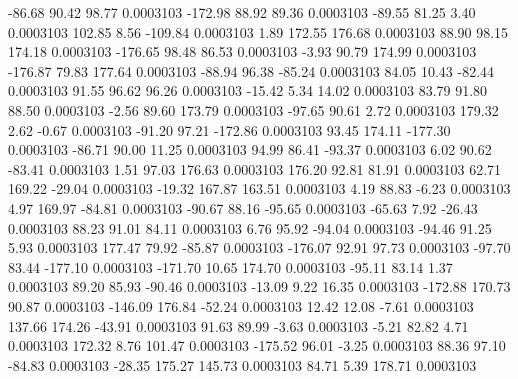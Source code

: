       -86.68       90.42       98.77     0.0003103
     -172.98       88.92       89.36     0.0003103
      -89.55       81.25        3.40     0.0003103
      102.85        8.56     -109.84     0.0003103
        1.89      172.55      176.68     0.0003103
       88.90       98.15      174.18     0.0003103
     -176.65       98.48       86.53     0.0003103
       -3.93       90.79      174.99     0.0003103
     -176.87       79.83      177.64     0.0003103
      -88.94       96.38      -85.24     0.0003103
       84.05       10.43      -82.44     0.0003103
       91.55       96.62       96.26     0.0003103
      -15.42        5.34       14.02     0.0003103
       83.79       91.80       88.50     0.0003103
       -2.56       89.60      173.79     0.0003103
      -97.65       90.61        2.72     0.0003103
      179.32        2.62       -0.67     0.0003103
      -91.20       97.21     -172.86     0.0003103
       93.45      174.11     -177.30     0.0003103
      -86.71       90.00       11.25     0.0003103
       94.99       86.41      -93.37     0.0003103
        6.02       90.62      -83.41     0.0003103
        1.51       97.03      176.63     0.0003103
      176.20       92.81       81.91     0.0003103
       62.71      169.22      -29.04     0.0003103
      -19.32      167.87      163.51     0.0003103
        4.19       88.83       -6.23     0.0003103
        4.97      169.97      -84.81     0.0003103
      -90.67       88.16      -95.65     0.0003103
      -65.63        7.92      -26.43     0.0003103
       88.23       91.01       84.11     0.0003103
        6.76       95.92      -94.04     0.0003103
      -94.46       91.25        5.93     0.0003103
      177.47       79.92      -85.87     0.0003103
     -176.07       92.91       97.73     0.0003103
      -97.70       83.44     -177.10     0.0003103
     -171.70       10.65      174.70     0.0003103
      -95.11       83.14        1.37     0.0003103
       89.20       85.93      -90.46     0.0003103
      -13.09        9.22       16.35     0.0003103
     -172.88      170.73       90.87     0.0003103
     -146.09      176.84      -52.24     0.0003103
       12.42       12.08       -7.61     0.0003103
      137.66      174.26      -43.91     0.0003103
       91.63       89.99       -3.63     0.0003103
       -5.21       82.82        4.71     0.0003103
      172.32        8.76      101.47     0.0003103
     -175.52       96.01       -3.25     0.0003103
       88.36       97.10      -84.83     0.0003103
      -28.35      175.27      145.73     0.0003103
       84.71        5.39      178.71     0.0003103
